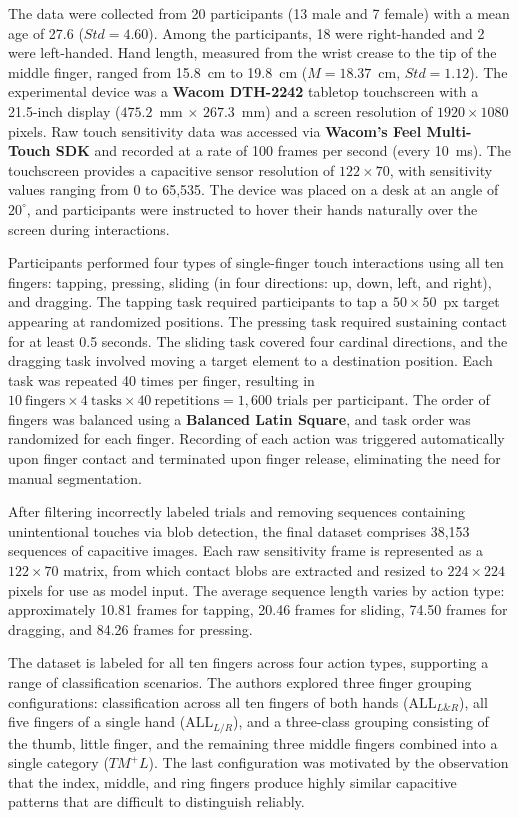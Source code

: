 \documentclass[../main.tex]{subfiles}
\begin{document}
The data were collected from 20 participants (13 male and 7 female) with a mean age 
of 27.6 ($Std = 4.60$). Among the participants, 18 were right-handed and 2 were 
left-handed. Hand length, measured from the wrist crease to the tip of the middle 
finger, ranged from 15.8~cm to 19.8~cm ($M = 18.37$~cm, $Std = 1.12$). The 
experimental device was a \textbf{Wacom DTH-2242} tabletop touchscreen with a 21.5-inch 
display ($475.2$~mm $\times$ $267.3$~mm) and a screen resolution of 
$1920 \times 1080$ pixels. Raw touch sensitivity data was accessed via \textbf{Wacom's 
Feel\texttrademark{} Multi-Touch SDK} and recorded at a rate of 100 frames per 
second (every 10~ms). The touchscreen provides a capacitive sensor resolution of 
$122 \times 70$, with sensitivity values ranging from 0 to 65,535. The device was 
placed on a desk at an angle of $20^\circ$, and participants were instructed to 
hover their hands naturally over the screen during interactions.

Participants performed four types of single-finger touch interactions using all ten 
fingers: tapping, pressing, sliding (in four directions: up, down, left, and right), 
and dragging. The tapping task required participants to tap a $50 \times 50$~px 
target appearing at randomized positions. The pressing task required sustaining 
contact for at least 0.5 seconds. The sliding task covered four cardinal directions, 
and the dragging task involved moving a target element to a destination position. 
Each task was repeated 40 times per finger, resulting in $10~\text{fingers} \times 
4~\text{tasks} \times 40~\text{repetitions} = 1{,}600$ trials per participant. The 
order of fingers was balanced using a \textbf{Balanced Latin Square}, and task order was 
randomized for each finger. Recording of each action was triggered automatically 
upon finger contact and terminated upon finger release, eliminating the need for 
manual segmentation.

After filtering incorrectly labeled trials and removing sequences containing 
unintentional touches via blob detection, the final dataset comprises 38,153 
sequences of capacitive images. Each raw sensitivity frame is represented as a 
$122 \times 70$ matrix, from which contact blobs are extracted and resized to 
$224 \times 224$ pixels for use as model input. The average sequence length varies 
by action type: approximately 10.81 frames for tapping, 20.46 frames for sliding, 
74.50 frames for dragging, and 84.26 frames for pressing.

The dataset is labeled for all ten fingers across four action types, supporting a 
range of classification scenarios. The authors explored three finger grouping 
configurations: classification across all ten fingers of both hands 
($\text{ALL}_{L\&R}$), all five fingers of a single hand ($\text{ALL}_{L/R}$), 
and a three-class grouping consisting of the thumb, little finger, and the remaining 
three middle fingers combined into a single category ($TM^{+}L$). The last 
configuration was motivated by the observation that the index, middle, and ring 
fingers produce highly similar capacitive patterns that are difficult to distinguish 
reliably.
\end{document}
